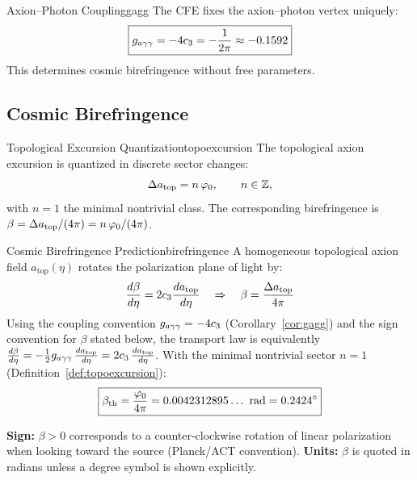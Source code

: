 \begin{corollary}{Axion--Photon Coupling}{gagg}
The CFE fixes the axion--photon vertex uniquely:
\begin{equation}
    \boxed{g_{a\gamma\gamma} = -4c_3 = -\frac{1}{2\pi} \approx -0.1592}
\end{equation}
This determines cosmic birefringence without free parameters.
\end{corollary}

\subsection{Cosmic Birefringence}

\begin{definition}{Topological Excursion Quantization}{topoexcursion}
The topological axion excursion is quantized in discrete sector changes:
\begin{equation}
    \Delta a_{\text{top}} = n\,\varphi_0, \qquad n\in\mathbb{Z},
\end{equation}
with $n=1$ the minimal nontrivial class. The corresponding birefringence is
$\beta = \Delta a_{\text{top}}/(4\pi) = n\,\varphi_0/(4\pi)$.
\end{definition}

\begin{theorem}{Cosmic Birefringence Prediction}{birefringence}
A homogeneous topological axion field $a_{\text{top}}(\eta)$ rotates the polarization plane of light by:
\begin{equation}
    \frac{d\beta}{d\eta} = 2c_3\frac{da_{\text{top}}}{d\eta} 
    \quad\Rightarrow\quad 
    \beta = \frac{\Delta a_{\text{top}}}{4\pi}
\end{equation}
Using the coupling convention $g_{a\gamma\gamma}=-4c_3$ (Corollary~\ref{cor:gagg}) and the sign convention for $\beta$ stated below, the transport law is equivalently
$\frac{d\beta}{d\eta} = -\frac{1}{2}g_{a\gamma\gamma}\,\frac{da_{\text{top}}}{d\eta} = 2c_3\,\frac{da_{\text{top}}}{d\eta}$.
With the minimal nontrivial sector $n=1$ (Definition~\ref{def:topoexcursion}):
\begin{equation}
    \boxed{\beta_{\text{th}} = \frac{\varphi_0}{4\pi} = 0.0042312895\ldots~\text{rad} = 0.2424^\circ}
\end{equation}
\end{theorem}

\begin{tcolorbox}[colback=yellow!3, colframe=yellow!60!black,
    title={\textbf{Sign conventions for $\beta$}}, fonttitle=\bfseries\small]
\textbf{Sign:} $\beta>0$ corresponds to a counter-clockwise rotation of linear polarization
when looking toward the source (Planck/ACT convention).
\textbf{Units:} $\beta$ is quoted in radians unless a degree symbol is shown explicitly.
\end{tcolorbox}

